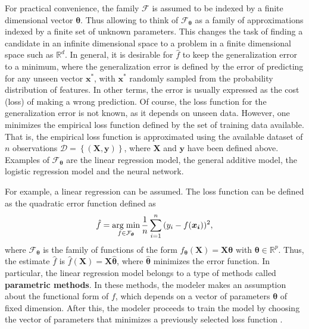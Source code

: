 For practical convenience, the family $\mathcal{F}$ is assumed to be indexed by a finite dimensional vector $\boldsymbol{\theta}$. Thus allowing to think of $\mathcal{F}_{\boldsymbol{\theta}}$ as a family of approximations indexed by a finite set of unknown parameters. This changes the task of finding a candidate in an infinite dimensional space to a problem in a finite dimensional space such as $\mathbb{R}^d$.
In general, it is desirable for $\hat{f}$ to keep the generalization error to a minimum, where the generalization error is defined by the error of predicting for any unseen vector $\boldsymbol{x}^*$, with $\boldsymbol{x}^*$ randomly sampled from the probability distribution of features. In other terms, the error is usually expressed as the cost (loss) of making a wrong prediction.
Of course, the loss function for the generalization error is not known, as it depends on unseen data. However, one minimizes the empirical loss function defined by the set of training data available. That is, the empirical loss function is approximated using the available dataset of $n$ observations $\mathcal{D} = \left\{ (\boldsymbol{X}, \boldsymbol{y}) \right\}$, where $\boldsymbol{X}$ and $\boldsymbol{y}$ have been defined above.
Examples of $\mathcal{F}_{\boldsymbol{\theta}}$ are the linear regression model, the general additive model, the logistic regression model and the neural network.

For example, a linear regression can be assumed. The loss function can be defined as the quadratic error function defined as
\begin{equation}
  \hat{f} = \operatorname*{arg\; min}_{f \in \mathcal{F}_{\boldsymbol{\theta}}} \frac{1}{n} \sum_{i = 1}^n{ ( y_i - f(\boldsymbol{x_i}) ) ^ 2},
\end{equation}
where $\mathcal{F}_{\boldsymbol{\theta}}$ is the family of functions of the form $f_{\boldsymbol{\theta}}(\boldsymbol{X}) = \boldsymbol{X}\boldsymbol{\theta}$ with $\boldsymbol{\theta} \in \mathbb{R}^p$. Thus, the  estimate $\hat{f}$ is $\hat{f}(\boldsymbol{X}) = \boldsymbol{X} \hat{\boldsymbol{\theta}}$, where $\hat{\boldsymbol{\theta}}$ minimizes the error function.
In particular, the linear regression model belongs to a type of methods called \textbf{parametric methods}. In these methods, the modeler makes an assumption about the functional form of $f$, which depends on a vector of parameters $\boldsymbol{\theta}$ of fixed dimension. After this, the modeler proceeds to train the model by choosing the vector of parameters that minimizes a previously selected loss function \cite[p.~21]{james2013introduction}.

